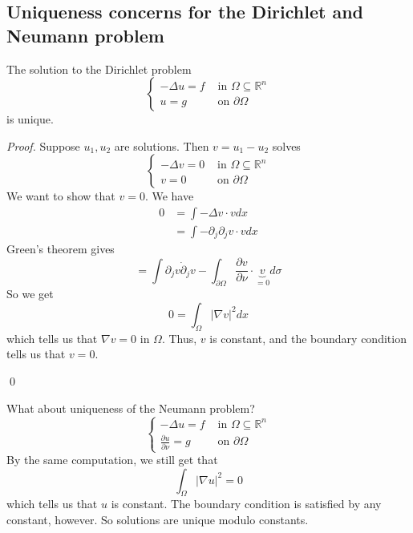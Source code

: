 \subsection{Uniqueness concerns for the Dirichlet and Neumann problem}
\begin{proposition}
     The solution to the Dirichlet problem
$$
\begin{cases}-\Delta u=f & \text { in } \Omega \subseteq \mathbb{R}^{n} \\ u=g & \text { on } \partial \Omega\end{cases}
$$
is unique.
\end{proposition}
\begin{proof}
    Suppose $u_{1}, u_{2}$ are solutions. Then $v=u_{1}-u_{2}$ solves
$$
\begin{cases}-\Delta v=0 & \text { in } \Omega \subseteq \mathbb{R}^{n} \\ v=0 & \text { on } \partial \Omega\end{cases}
$$
We want to show that $v=0$. We have
$$
\begin{aligned}
0 &=\int-\Delta v \cdot v d x \\
&=\int-\partial_{j} \partial_{j} v \cdot v d x
\end{aligned}
$$
Green's theorem gives
$$
=\int \partial_{j} v \dot{\partial}_{j} v-\int_{\partial \Omega} \frac{\partial v}{\partial \nu} \cdot \underbrace{v}_{=0} d \sigma
$$
So we get
$$
0=\int_{\Omega}|\nabla v|^{2} d x
$$
which tells us that $\nabla v=0$ in $\Omega$. Thus, $v$ is constant, and the boundary condition tells us that $v=0$.

\qed 
\end{proof}
\begin{remark}
     What about uniqueness of the Neumann problem?
    $$
    \begin{cases}-\Delta u=f & \text { in } \Omega \subseteq \mathbb{R}^{n} \\ \frac{\partial u}{\partial \nu}=g & \text { on } \partial \Omega\end{cases}
    $$
    By the same computation, we still get that
    $$
    \int_{\Omega}|\nabla u|^{2}=0
    $$
    which tells us that $u$ is constant. The boundary condition is satisfied by any constant, however. So solutions are unique modulo constants.
\end{remark}

